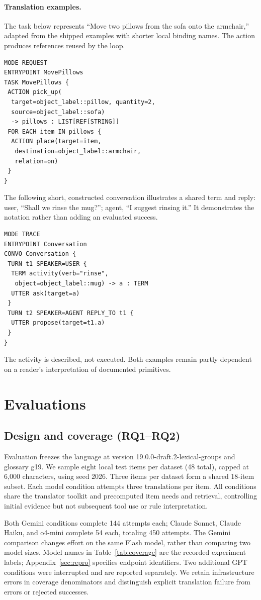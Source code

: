 \documentclass[11pt]{article}
\begin{document}
\paragraph{Translation examples.}
The task below represents ``Move two pillows from the sofa onto the armchair,'' adapted from the shipped examples with shorter local binding names. The action produces references reused by the loop.
\begin{lstlisting}
MODE REQUEST
ENTRYPOINT MovePillows
TASK MovePillows {
 ACTION pick_up(
  target=object_label::pillow, quantity=2,
  source=object_label::sofa)
  -> pillows : LIST[REF[STRING]]
 FOR EACH item IN pillows {
  ACTION place(target=item,
   destination=object_label::armchair,
   relation=on)
 }
}
\end{lstlisting}
The following short, constructed conversation illustrates a shared term and reply: user, ``Shall we rinse the mug?''; agent, ``I suggest rinsing it.'' It demonstrates the notation rather than adding an evaluated success.
\begin{lstlisting}
MODE TRACE
ENTRYPOINT Conversation
CONVO Conversation {
 TURN t1 SPEAKER=USER {
  TERM activity(verb="rinse",
   object=object_label::mug) -> a : TERM
  UTTER ask(target=a)
 }
 TURN t2 SPEAKER=AGENT REPLY_TO t1 {
  UTTER propose(target=t1.a)
 }
}
\end{lstlisting}
The activity is described, not executed. Both examples remain partly dependent on a reader's interpretation of documented primitives.

\section{Evaluations}
\label{sec:eval}
\subsection{Design and coverage (RQ1--RQ2)}
Evaluation freezes the language at version 19.0.0-draft.2-lexical-groups and glossary g19. We sample eight local test items per dataset (48 total), capped at 6,000 characters, using seed 2026. Three items per dataset form a shared 18-item subset. Each model condition attempts three translations per item. All conditions share the translator toolkit and precomputed item needs and retrieval, controlling initial evidence but not subsequent tool use or rule interpretation.

Both Gemini conditions complete 144 attempts each; Claude Sonnet, Claude Haiku, and o4-mini complete 54 each, totaling 450 attempts. The Gemini comparison changes effort on the same Flash model, rather than comparing two model sizes. Model names in Table~\ref{tab:coverage} are the recorded experiment labels; Appendix~\ref{sec:repro} specifies endpoint identifiers. Two additional GPT conditions were interrupted and are reported separately. We retain infrastructure errors in coverage denominators and distinguish explicit translation failure from errors or rejected successes.
\end{document}
